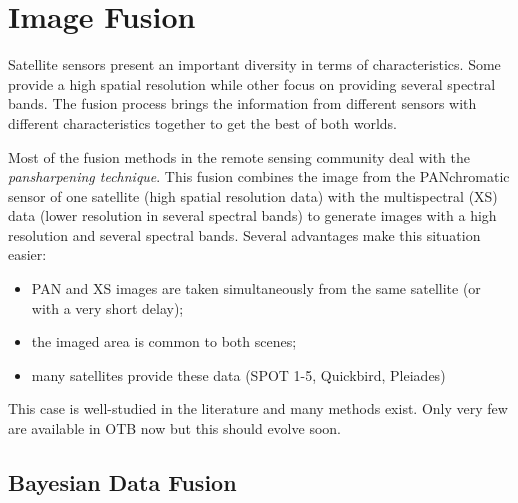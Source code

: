 
\chapter{Image Fusion }

Satellite sensors present an important diversity in terms of characteristics.
Some provide a high spatial resolution while other focus on providing several
spectral bands. The fusion process brings the information from different
sensors with different characteristics together to get the best of both
worlds.

Most of the fusion methods in the remote sensing community deal with
the {\em pansharpening technique}. This fusion combines the image from
the PANchromatic sensor of one satellite (high spatial resolution
data) with the multispectral (XS) data (lower resolution in several
spectral bands) to generate images with a high resolution and several
spectral bands. Several advantages make this situation easier:

\begin{itemize}
\item PAN and XS images are taken simultaneously from the same satellite (or
with a very short delay);
\item the imaged area is common to both scenes;
\item many satellites provide these data (SPOT 1-5, Quickbird, Pleiades)
\end{itemize}

This case is well-studied in the literature and many methods exist. Only very
few are available in OTB now but this should evolve soon.



\section{Bayesian Data Fusion}\label{secBayesian}



